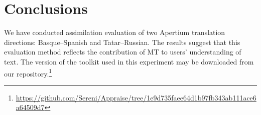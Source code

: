 \documentclass[11pt]{article}
\begin{document}


\section{Conclusions}
\label{sec:conclusion}
We have conducted assimilation evaluation of two Apertium translation directions: Basque--Spanish and Tatar--Russian. The results suggest that this evaluation method reflects the contribution of MT to users' understanding of text. The version of the toolkit used in this 
experiment may be downloaded from our repository.\footnote{{\url{https://github.com/Sereni/Appraise/tree/1e9d735faee64d1b97fb343ab111ace6a64509d7}}}
\end{document}
